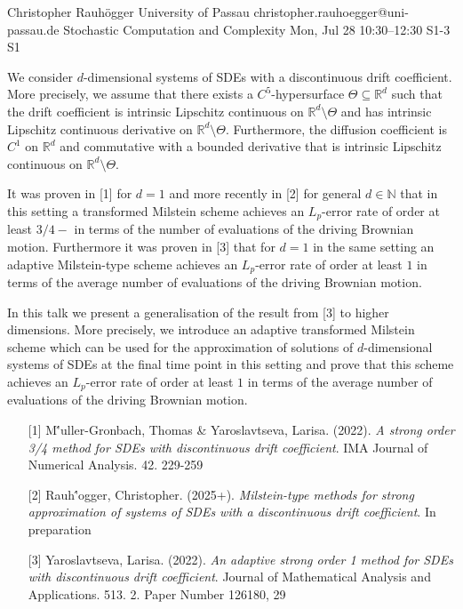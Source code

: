 \begin{talk}
  {Christopher Rauh\"ogger}%
  {University of Passau}%
  {christopher.rauhoegger@uni-passau.de}%
  {Stochastic Computation and Complexity}%
  {}%
  {}%
  {Mon, Jul 28 10:30–12:30}%
  {S1-3}%
  {S1}%
				
			
We consider $d$-dimensional systems of SDEs with a discontinuous drift coefficient. More precisely,
we assume that there exists a $C^{5}$-hypersurface
$\Theta\subseteq \mathbb{R}^{d}$ such that the drift coefficient is intrinsic Lipschitz continuous on $\mathbb{R}^{d}\setminus \Theta$ and has intrinsic Lipschitz continuous derivative on $\mathbb{R}^{d}\setminus \Theta$.
Furthermore, the diffusion coefficient is $C^{1}$ on $\mathbb{R}^{d}$ and commutative with a bounded derivative that is intrinsic Lipschitz continuous on $\mathbb{R}^{d}\setminus \Theta$.

It was proven in [1] for $d = 1$ and more recently in [2] for general $d \in \mathbb{N}$ that in this setting a transformed Milstein scheme achieves an $L_{p}$-error rate of order at least $3/4-$ in terms of the number of evaluations of the
driving Brownian motion.
Furthermore it was proven in [3] that for $d = 1$ in the same setting an adaptive Milstein-type scheme achieves an $L_{p}$-error rate of order at least $1$ in terms of the average number of evaluations of the driving Brownian motion. 

In this talk we present a generalisation of the result from [3] to higher dimensions. More precisely, we introduce an adaptive transformed Milstein scheme which can be used for the approximation of solutions of $d$-dimensional systems of SDEs at the final time point in this setting and
prove that this scheme achieves an $L_{p}$-error rate of order at least $1$ in terms of the average number of evaluations of the
driving Brownian motion.

\medskip

\begin{enumerate}
	\item[{[1]}] M\''{u}ller-Gronbach, Thomas \& Yaroslavtseva, Larisa. (2022). {\it A strong order 3/4 method for {SDE}s with discontinuous drift
		coefficient}. IMA Journal of Numerical Analysis. 42. 229-259
	\item[{[2]}] Rauh\''ogger, Christopher. (2025+). {\it Milstein-type methods for strong approximation of systems of SDEs with a discontinuous drift coefficient}. In preparation
	\item[{[3]}] Yaroslavtseva, Larisa. (2022). {\it An adaptive strong order 1 method for {SDE}s with
		discontinuous drift coefficient}. Journal of Mathematical Analysis and Applications. 513. 2. Paper Number 126180, 29
\end{enumerate}

\end{talk}

